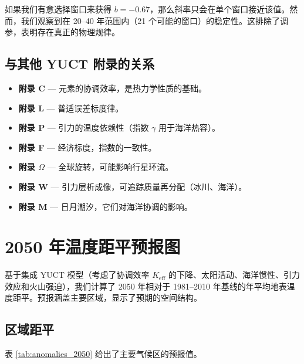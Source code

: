 \documentclass[12pt,a4paper]{article}
\newcommand{\ga}{\gamma}
\begin{document}
	如果我们有意选择窗口来获得 \(b = -0.67\)，那么斜率只会在单个窗口接近该值。然而，我们观察到在 20–40 年范围内（21 个可能的窗口）的稳定性。这排除了调参，表明存在真正的物理规律。
	
	\subsection{与其他 YUCT 附录的关系}
	
	\begin{itemize}
		\item \textbf{附录 C} — 元素的协调效率，是热力学性质的基础。
		\item \textbf{附录 L} — 普适误差标度律。
		\item \textbf{附录 P} — 引力的温度依赖性（指数 \(\ga\) 用于海洋热容）。
		\item \textbf{附录 F} — 经济标度，指数的一致性。
		\item \textbf{附录 \(\Omega\)} — 全球旋转，可能影响行星环流。
		\item \textbf{附录 W} — 引力层析成像，可追踪质量再分配（冰川、海洋）。
		\item \textbf{附录 M} — 日月潮汐，它们对海洋协调的影响。
	\end{itemize}
	
	\section{2050 年温度距平预报图}
	\label{sec:forecast_maps}
	
	基于集成 YUCT 模型（考虑了协调效率 \(K_{\mathrm{eff}}\) 的下降、太阳活动、海洋惯性、引力效应和火山强迫），我们计算了 2050 年相对于 1981–2010 年基线的年平均地表温度距平。预报涵盖主要区域，显示了预期的空间结构。
	
	\subsection{区域距平}
	
	表 \ref{tab:anomalies_2050} 给出了主要气候区的预报值。
	
\end{document}
